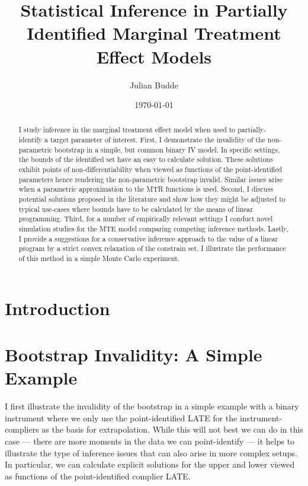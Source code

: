 \documentclass[12pt,a4paper,english]{article} %
\title{Statistical Inference in Partially Identified Marginal Treatment Effect Models}
\author{Julian Budde}
\date{\today}
\numberwithin{equation}{section}
\theoremstyle{definition}
\theoremstyle{remark}
\theoremstyle{plain}
\begin{document}
\maketitle

\begin{abstract}
	I study inference in the marginal treatment effect model when used to partially-identify a target parameter of interest.
	First, I demonstrate the invalidity of the non-parametric bootstrap in a simple, but common binary IV model.
	In specific settings, the bounds of the identified set have an easy to calculate solution.
	These solutions exhibit points of non-differentiability when viewed as functions of the point-identified parameters hence rendering the non-parametric bootstrap invalid.
	Similar issues arise when a parametric approximation to the MTR functions is used.
  Second, I discuss potential solutions proposed in the literature and show how they might be adjusted to typical use-cases where bounds have to be calculated by the means of linear programming.
	Third, for a number of empirically relevant settings I conduct novel simulation studies for the MTE model comparing competing inference methods.
  Lastly, I provide a suggestions for a conservative inference approach to the value of a linear program by a strict convex relaxation of the constrain set.
  I illustrate the performance of this method in a simple Monte Carlo experiment.
\end{abstract}

\clearpage
\newpage

\tableofcontents

\clearpage
\newpage

\listoftables

\clearpage
\newpage

\listoffigures

\clearpage
\newpage

\section{Introduction}\label{sec:introduction}

\section{Bootstrap Invalidity: A Simple Example}\label{sec:simple_example}
I first illustrate the invalidity of the bootstrap in a simple example with a binary instrument where we only use the point-identified LATE for the instrument-compliers as the basis for extrapolation.
While this will not best we can do in this case --- there are more moments in the data we can point-identify --- it helps to illustrate the type of inference issues that can also arise in more complex setups.
In particular, we can calculate explicit solutions for the upper and lower viewed as functions of the point-identified complier LATE.\@
\end{document}
